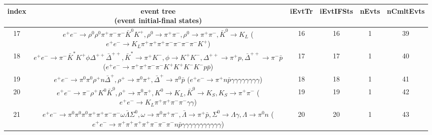 \documentclass[landscape]{article}
\begin{document}
\begin{table}[htbp!]
\small
\centering
\begin{tabular}{|c|c|c|c|c|c|}
\hline
index & \thead{event tree \\ (event initial-final states)} & iEvtTr & iEvtIFSts & nEvts & nCmltEvts \\
\hline
17 & \makecell{ $ 
e^{+} e^{-} \rightarrow \rho^{0} \rho^{0} \pi^{+} \pi^{-} \pi^{-} \bar{K}^{0} K^{+} ,
\rho^{0} \rightarrow \pi^{+} \pi^{-} ,
\rho^{0} \rightarrow \pi^{+} \pi^{-} ,
\bar{K}^{0} \rightarrow K_{L} 
$ \\ ($
e^{+} e^{-} \rightarrow K_{L} \pi^{+} \pi^{+} \pi^{+} \pi^{-} \pi^{-} \pi^{-} \pi^{-} K^{+} 
$) } & 16 & 16 & 1 & 39 \\
\hline
18 & \makecell{ $ 
e^{+} e^{-} \rightarrow \pi^{-} \bar{K}^{*} K^{+} \phi \Delta^{++} \bar{\Delta}^{++} ,
\bar{K}^{*} \rightarrow \pi^{+} K^{-} ,
\phi \rightarrow K^{+} K^{-} ,
\Delta^{++} \rightarrow \pi^{+} p ,
\bar{\Delta}^{++} \rightarrow \pi^{-} \bar{p} 
$ \\ ($
e^{+} e^{-} \rightarrow \pi^{+} \pi^{+} \pi^{-} \pi^{-} K^{+} K^{+} K^{-} K^{-} p \bar{p} 
$) } & 17 & 17 & 1 & 40 \\
\hline
19 & \makecell{ $ 
e^{+} e^{-} \rightarrow \pi^{0} \pi^{0} \rho^{+} n \bar{\Delta}^{+} ,
\rho^{+} \rightarrow \pi^{0} \pi^{+} ,
\bar{\Delta}^{+} \rightarrow \pi^{0} \bar{p} 
$ \\ ($
e^{+} e^{-} \rightarrow \pi^{+} n \bar{p} \gamma \gamma \gamma \gamma \gamma \gamma \gamma \gamma 
$) } & 18 & 18 & 1 & 41 \\
\hline
20 & \makecell{ $ 
e^{+} e^{-} \rightarrow \pi^{-} \rho^{+} K^{0} \bar{K}^{0} ,
\rho^{+} \rightarrow \pi^{0} \pi^{+} ,
K^{0} \rightarrow K_{L} ,
\bar{K}^{0} \rightarrow K_{S} ,
K_{S} \rightarrow \pi^{+} \pi^{-} 
$ \\ ($
e^{+} e^{-} \rightarrow K_{L} \pi^{+} \pi^{+} \pi^{-} \pi^{-} \gamma \gamma 
$) } & 19 & 19 & 1 & 42 \\
\hline
21 & \makecell{ $ 
e^{+} e^{-} \rightarrow \pi^{0} \pi^{0} \pi^{0} \pi^{+} \pi^{+} \pi^{-} \pi^{-} \omega \bar{\Lambda} \Sigma^{0} ,
\omega \rightarrow \pi^{0} \pi^{+} \pi^{-} ,
\bar{\Lambda} \rightarrow \pi^{+} \bar{p} ,
\Sigma^{0} \rightarrow \Lambda \gamma ,
\Lambda \rightarrow \pi^{0} n 
$ \\ ($
e^{+} e^{-} \rightarrow \pi^{+} \pi^{+} \pi^{+} \pi^{+} \pi^{-} \pi^{-} \pi^{-} n \bar{p} \gamma \gamma \gamma \gamma \gamma \gamma \gamma \gamma \gamma \gamma \gamma 
$) } & 20 & 20 & 1 & 43 \\

\end{tabular}
\end{table}
\end{document}
